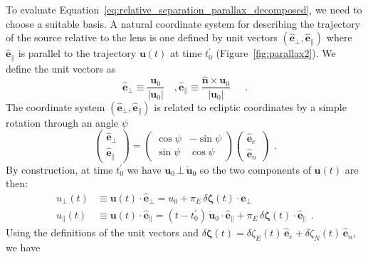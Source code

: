 \documentclass[12pt,dvipsnames]{report}
\newcommand{\hquad}{~~}
\begin{document}
To evaluate Equation~\ref{eq:relative_separation_parallax_decomposed}, we need
to choose a suitable basis. A natural coordinate system for describing the
trajectory of the source relative to the lens is one defined by unit vectors
$(\mathbf{\hat e}_\bot,\mathbf{\hat e}_\parallel)$ where $\mathbf{\hat e}_\parallel$ 
is parallel to the trajectory $\mathbf{u}(t)$ at time $t_0^\prime$
(Figure~\ref{fig:parallax2}). 
We define the unit vectors as
\begin{equation}
    \mathbf{\hat e}_\bot\equiv \frac{\mathbf{u}_0}{|\mathbf{u}_0|}\quad,
    \mathbf{\hat e}_\parallel\equiv \frac{\mathbf{\hat n}\times\mathbf{u}_0}{|\mathbf{u}_0|}\quad
    \hquad.
\end{equation}
The coordinate system $(\mathbf{\hat e}_\bot,\mathbf{\hat e}_\parallel)$ is related to 
ecliptic coordinates by a simple rotation through an angle $\psi$
\begin{equation}
    \begin{pmatrix}
        \mathbf{\hat e}_\bot \\
        \mathbf{\hat e}_\parallel
    \end{pmatrix}
    =
    \begin{pmatrix}
        \cos\psi & -\sin\psi \\
        \sin\psi & \cos\psi
    \end{pmatrix}
    \begin{pmatrix}
        \mathbf{\hat e}_e \\
        \mathbf{\hat e}_n
    \end{pmatrix}
    \label{eq:ecliptic_to_parallel}
    \hquad.
\end{equation}
By construction, at time $t_0^\prime$ we have
$\mathbf{u}_0\,\bot\,\dot{\mathbf{u}}_0$ so the two components of
$\mathbf{u}(t)$ are then:
\begin{align}
    u_\bot(t)      & \equiv \mathbf{u}(t)\cdot \mathbf{\hat e}_\bot= u_0 +
    \pi_E\,\delta\boldsymbol \zeta(t)\cdot\mathbf{\hat e}_\bot                                                                                                                                       \\
    u_\parallel(t) & \equiv \mathbf{u}(t)\cdot \mathbf{\hat e}_\parallel= (t-t_0^\prime)\,\dot{\mathbf{u}}_0\cdot\mathbf{\hat e}_\parallel+ \pi_E\,\delta\boldsymbol \zeta(t)\cdot\mathbf{\hat e}_\parallel
    \hquad.
\end{align}
Using the definitions of the unit vectors and
$\delta\boldsymbol \zeta(t)=
    \delta \zeta_E(t)\,\mathbf{\hat e}_e+\delta \zeta_N(t)\,\mathbf{\hat e}_n$, we have
\end{document}
